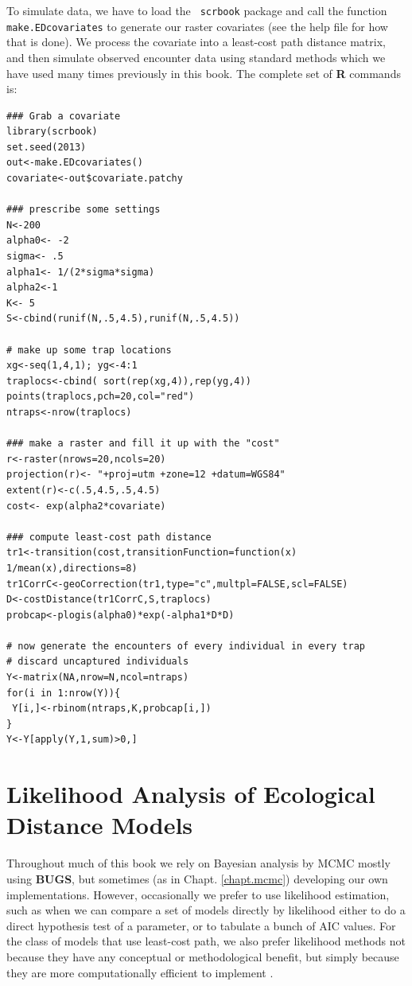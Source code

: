 To simulate data,
 we have to load the \mbox{\tt
scrbook} package and call the function \mbox{\tt make.EDcovariates} to generate
our raster covariates (see the help file for how that is done). We
process the covariate into a least-cost path distance
matrix, and then simulate observed encounter data using standard methods
which we have used many times previously in this book. The complete set
of {\bf R} commands is: 
{\small
\begin{verbatim}
### Grab a covariate
library(scrbook)
set.seed(2013)
out<-make.EDcovariates()
covariate<-out$covariate.patchy

### prescribe some settings
N<-200
alpha0<- -2
sigma<- .5
alpha1<- 1/(2*sigma*sigma)
alpha2<-1
K<- 5
S<-cbind(runif(N,.5,4.5),runif(N,.5,4.5))

# make up some trap locations
xg<-seq(1,4,1); yg<-4:1
traplocs<-cbind( sort(rep(xg,4)),rep(yg,4))
points(traplocs,pch=20,col="red")
ntraps<-nrow(traplocs)

### make a raster and fill it up with the "cost"
r<-raster(nrows=20,ncols=20)
projection(r)<- "+proj=utm +zone=12 +datum=WGS84"
extent(r)<-c(.5,4.5,.5,4.5)
cost<- exp(alpha2*covariate)

### compute least-cost path distance
tr1<-transition(cost,transitionFunction=function(x) 1/mean(x),directions=8)
tr1CorrC<-geoCorrection(tr1,type="c",multpl=FALSE,scl=FALSE)
D<-costDistance(tr1CorrC,S,traplocs)
probcap<-plogis(alpha0)*exp(-alpha1*D*D)

# now generate the encounters of every individual in every trap
# discard uncaptured individuals
Y<-matrix(NA,nrow=N,ncol=ntraps)
for(i in 1:nrow(Y)){
 Y[i,]<-rbinom(ntraps,K,probcap[i,])
}
Y<-Y[apply(Y,1,sum)>0,]
\end{verbatim}
}


\section{Likelihood Analysis of Ecological Distance Models}
\label{ecoldist.sec.mle}

Throughout much of this book we rely on Bayesian analysis by MCMC
mostly using {\bf BUGS}, but sometimes (as in Chapt. \ref{chapt.mcmc})
developing our own implementations. However, occasionally we prefer to
use likelihood estimation, such as when we can compare a set of models
directly by likelihood either to do a direct hypothesis test of a
parameter, or to tabulate a bunch of AIC values. For the class of
models that use least-cost path, we also prefer likelihood methods not
because they have any conceptual or methodological benefit, but simply
because they are more computationally efficient to implement
\citep{royle_etal:2012ecol}.


